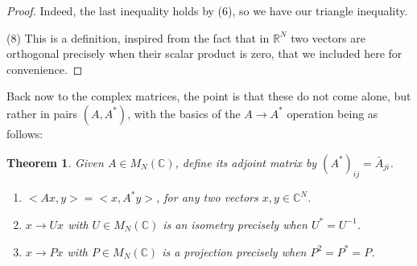 \documentclass[12pt]{amsbook}
\newtheorem{theorem}{Theorem}[chapter]
\begin{document}
\begin{proof}
Indeed, the last inequality holds by (6), so we have our triangle inequality.

\medskip

(8) This is a definition, inspired from the fact that in $\mathbb R^N$ two vectors are orthogonal precisely when their scalar product is zero, that we included here for convenience.
\end{proof}

Back now to the complex matrices, the point is that these do not come alone, but rather in pairs $(A,A^*)$, with the basics of the $A\to A^*$ operation being as follows:


\begin{theorem}
Given $A\in M_N(\mathbb C)$, define its adjoint matrix by $(A^*)_{ij}=\bar{A}_{ji}$.
\begin{enumerate}
\item $<Ax,y>=<x,A^*y>$, for any two vectors $x,y\in\mathbb C^N$.

\item $x\to Ux$ with $U\in M_N(\mathbb C)$ is an isometry precisely when $U^*=U^{-1}$.

\item $x\to Px$ with $P\in M_N(\mathbb C)$ is a projection precisely when $P^2=P^*=P$.
\end{enumerate}
\end{theorem}
\end{document}
